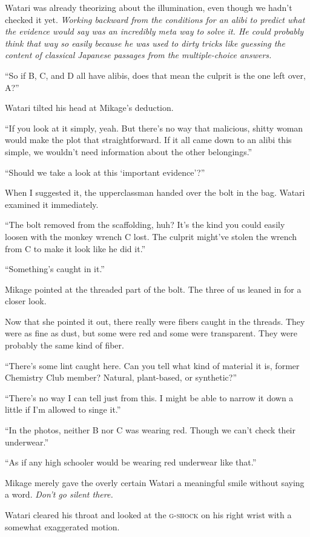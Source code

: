 \documentclass[
    a4paper,
    12pt,
    twoside,
    openany,
    UTF8,
    fontset=windows
]{ctexbook}
\begin{document}
Watari was already theorizing about the illumination, even though we hadn't checked it yet. \textit{Working backward from the conditions for an alibi to predict what the evidence would say was an incredibly meta way to solve it. He could probably think that way so easily because he was used to dirty tricks like guessing the content of classical Japanese passages from the multiple-choice answers.}

``So if B, C, and D all have alibis, does that mean the culprit is the one left over, A?''

Watari tilted his head at Mikage's deduction.

``If you look at it simply, yeah. But there's no way that malicious, shitty woman would make the plot that straightforward. If it all came down to an alibi this simple, we wouldn't need information about the other belongings.''

``Should we take a look at this `important evidence'?''

When I suggested it, the upperclassman handed over the bolt in the bag. Watari examined it immediately.

``The bolt removed from the scaffolding, huh? It's the kind you could easily loosen with the monkey wrench C lost. The culprit might've stolen the wrench from C to make it look like he did it.''

``Something's caught in it.''

Mikage pointed at the threaded part of the bolt. The three of us leaned in for a closer look.

Now that she pointed it out, there really were fibers caught in the threads. They were as fine as dust, but some were red and some were transparent. They were probably the same kind of fiber.

``There's some lint caught here. Can you tell what kind of material it is, former Chemistry Club member? Natural, plant-based, or synthetic?''

``There's no way I can tell just from this. I might be able to narrow it down a little if I'm allowed to singe it.''

``In the photos, neither B nor C was wearing red. Though we can't check their underwear.''

``As if any high schooler would be wearing red underwear like that.''

Mikage merely gave the overly certain Watari a meaningful smile without saying a word. \textit{Don't go silent there.}

Watari cleared his throat and looked at the \textsc{g-shock} on his right wrist with a somewhat exaggerated motion.
\end{document}
